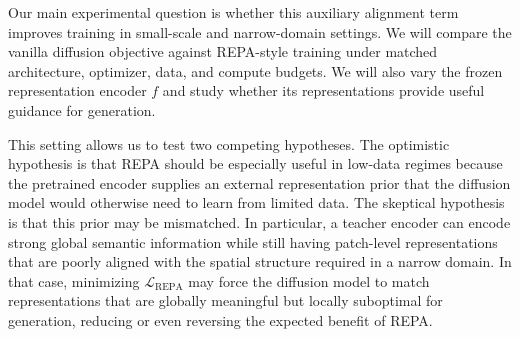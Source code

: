 Our main experimental question is whether this auxiliary alignment term improves training in small-scale and narrow-domain settings. We will compare the vanilla diffusion objective against REPA-style training under matched architecture, optimizer, data, and compute budgets. We will also vary the frozen representation encoder $f$ and study whether its representations provide useful guidance for generation.

This setting allows us to test two competing hypotheses. The optimistic hypothesis is that REPA should be especially useful in low-data regimes because the pretrained encoder supplies an external representation prior that the diffusion model would otherwise need to learn from limited data. The skeptical hypothesis is that this prior may be mismatched. In particular, a teacher encoder can encode strong global semantic information while still having patch-level representations that are poorly aligned with the spatial structure required in a narrow domain. In that case, minimizing $\mathcal{L}_{\mathrm{REPA}}$ may force the diffusion model to match representations that are globally meaningful but locally suboptimal for generation, reducing or even reversing the expected benefit of REPA.
